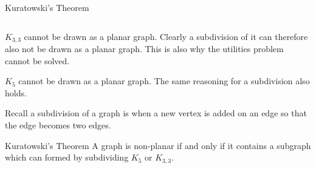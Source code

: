 \documentclass[8pt]{beamer}
\begin{document}
\begin{frame}{Kuratowski's Theorem}
\begin{columns}[T]
\end{columns}


$K_{3,3}$ cannot be drawn as a planar graph. Clearly a subdivision of it can therefore also not be drawn as a planar graph. This is also why the utilities problem cannot be solved.

$K_5$ cannot be drawn as a planar graph. The same reasoning for a subdivision also holds.

Recall a subdivision of a graph is when a new vertex is added on an edge so that the edge becomes two edges.

\begin{alertblock}{Kuratowski's Theorem}
	A graph is non-planar if and only if it contains a subgraph which can formed by subdividing $K_5$ or  $K_{3,3}$.
\end{alertblock}
\end{frame}
\end{document}
